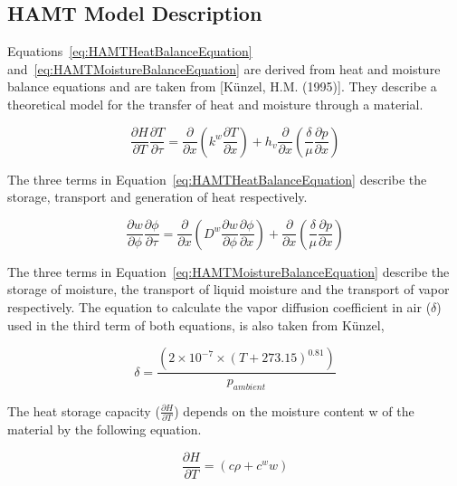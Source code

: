 \subsection{HAMT Model Description}\label{hamt-model-description}

Equations~\ref{eq:HAMTHeatBalanceEquation}
and~\ref{eq:HAMTMoistureBalanceEquation} are derived from heat and moisture
balance equations and are taken from {[}K\"unzel, H.M. (1995){]}. They
describe a theoretical model for the transfer of heat and moisture through
a material.

\begin{equation}
\frac{{\partial H}}{{\partial T}}\frac{{\partial T}}{{\partial \tau }} = \frac{\partial }{{\partial x}}\left( {{k^w}\frac{{\partial T}}{{\partial x}}} \right) + {h_v}\frac{\partial }{{\partial x}}\left( {\frac{\delta }{\mu }\frac{{\partial p}}{{\partial x}}} \right)
\label{eq:HAMTHeatBalanceEquation}
\end{equation}

The three terms in Equation~\ref{eq:HAMTHeatBalanceEquation} describe the
storage, transport and generation of heat respectively.

\begin{equation}
\frac{{\partial w}}{{\partial \phi }}\frac{{\partial \phi }}{{\partial \tau }} = \frac{\partial }{{\partial x}}\left( {{D^w}\frac{{\partial w}}{{\partial \phi }}\frac{{\partial \phi }}{{\partial x}}} \right) + \frac{\partial }{{\partial x}}\left( {\frac{\delta }{\mu }\frac{{\partial p}}{{\partial x}}} \right)
\label{eq:HAMTMoistureBalanceEquation}
\end{equation}

The three terms in Equation~\ref{eq:HAMTMoistureBalanceEquation} describe the storage of moisture, the transport
of liquid moisture and the transport of vapor respectively. The equation to calculate the vapor diffusion
coefficient in air (\(\delta\)) used in the third term of both equations, is also taken from K\"unzel,

\begin{equation}
\delta  = \frac{{\left( {2 \times {{10}^{ - 7}} \times {{\left( {T + 273.15} \right)}^{0.81}}} \right)}}{{{p_{ambient}}}}
\end{equation}

The heat storage capacity (\(\frac{\partial H}{\partial T}\)) depends on the moisture content w of the material by the following equation.

\begin{equation}
\frac{{\partial H}}{{\partial T}} = \left( {c\rho  + {c^w}w} \right)
\end{equation}


